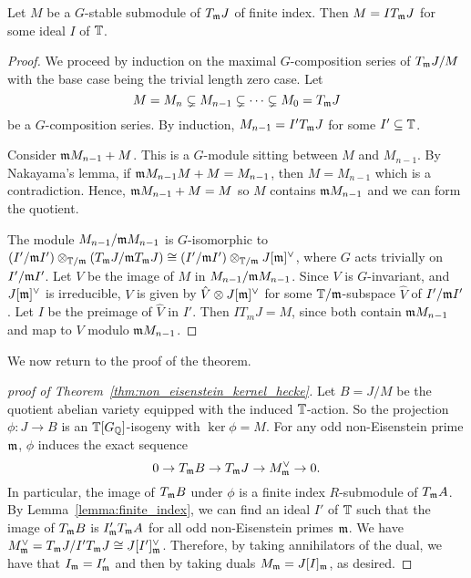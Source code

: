 \documentclass{article}
\begin{document}
\begin{lemma}\label{lemma:finite_index}
    Let $M$ be a $G$-stable submodule of $T_{\mathfrak{m}} J$ of finite index. Then
    $M=IT_{\mathfrak{m}} J$ for some ideal $I$ of $\mathbb{T}$.
\end{lemma}
\begin{proof}
    We proceed by induction on the maximal $G$-composition series of $T_{\mathfrak{m}} J/M$
    with the base case being the trivial length zero case. Let 
    \[
        M = M_n \subsetneq M_{n-1} \subsetneq \cdots \subsetneq M_0 = T_{\mathfrak{m}} J
    \]
    be a $G$-composition series. By induction, $M_{n-1} = I'T_{\mathfrak{m}} J$ for some
    $I'\subseteq \mathbb{T}$.

    Consider $\mathfrak{m} M_{n-1} + M$. This is a $G$-module sitting between $M$ and
    $M_{n-1}$. By Nakayama's lemma, if $\mathfrak{m} M_{n-1} M + M = M_{n-1}$, then
    $M=M_{n-1}$ which is a contradiction. Hence, $\mathfrak{m} M_{n-1}+M=M$ so $M$
    contains $\mathfrak{m} M_{n-1}$ and we can form the quotient.

    The module $M_{n-1}/\mathfrak{m} M_{n-1}$ is $G$-isomorphic to $(I'/\mathfrak{m}
    I')\otimes_{\mathbb{T}/\mathfrak{m}} (T_{\mathfrak{m}} J/\mathfrak{m} T_{\mathfrak{m}} J) \cong (I'/\mathfrak{m} I')\otimes_{\mathbb{T}/\mathfrak{m}}
    J[\mathfrak{m}]^\vee$, where $G$ acts trivially on $I'/\mathfrak{m} I'$. Let $V$ be the image
    of $M$ in $M_{n-1}/\mathfrak{m} M_{n-1}$. Since $V$ is $G$-invariant, and
    $J[\mathfrak{m}]^\vee$ is irreducible, $V$ is given by $\hat{V}\otimes J[\mathfrak{m}]^\vee$
    for some $\mathbb{T}/\mathfrak{m}$-subspace $\hat{V}$ of $I'/\mathfrak{m} I'$. Let $I$ be the preimage
    of $\hat{V}$ in $I'$. Then $IT_m J = M$, since both contain $\mathfrak{m} M_{n-1}$
    and map to $V$ modulo $\mathfrak{m} M_{n-1}$.
\end{proof}

We now return to the proof of the theorem.

\begin{proof}[proof of Theorem~\ref{thm:non_eisenstein_kernel_hecke}]
    Let $B=J/M$ be the quotient abelian variety equipped with the induced
    $\mathbb{T}$-action. So the projection $\phi:J \to B$ is an $\mathbb{T}[G_{\mathbb{Q}}]$-isogeny
    with $\ker\phi = M$. For any odd non-Eisenstein prime $\mathfrak{m}$, $\phi$ induces
    the exact sequence
    \[ 
        0 \to T_{\mathfrak{m}} B \to T_{\mathfrak{m}} J \to M^\vee _{\mathfrak{m}} \to 0.
    \] 
    In particular, the image of $T_{\mathfrak{m}} B$ under $\phi$ is a finite index
    $R$-submodule of $T_{\mathfrak{m}} A$. By Lemma~\ref{lemma:finite_index}, we can find
    an ideal $I'$ of $\mathbb{T}$ such that the image of $T_{\mathfrak{m}} B$ is $I' _{\mathfrak{m}} T_{\mathfrak{m}} A$
    for all odd non-Eisenstein primes $\mathfrak{m}$. We have $M^\vee _{\mathfrak{m}} = T_{\mathfrak{m}} J / I'
    T_{\mathfrak{m}} J\cong J[I']_{\mathfrak{m}} ^\vee$. Therefore, by taking annihilators of the dual,
    we have that $I_{\mathfrak{m}} = I'_{\mathfrak{m}}$ and then by taking duals $M_{\mathfrak{m}} = J[I]_{\mathfrak{m}}$, as
    desired.
\end{proof}
\end{document}

